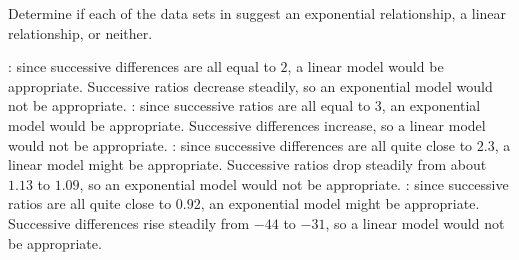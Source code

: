 \begin{doyouunderstand}
	\begin{problem}
	Determine if each of the data sets in  
	suggest an exponential relationship, a linear relationship, or neither. 
	\begin{shortsolution}
		: since successive differences are all equal to $2$, a linear model would be appropriate. 
		Successive ratios decrease steadily, so an exponential model would not be appropriate.
		: since successive ratios are all equal to $3$, an exponential model would be appropriate.  
		Successive differences increase, so a linear model would not be appropriate.
		: since successive differences are all quite close to $2.3$, a linear model might be appropriate.  
		Successive ratios drop steadily from about $1.13$ to $1.09$, so an exponential model would not be appropriate.
		: since successive ratios are all quite close to $0.92$, an exponential model might be appropriate.  
		Successive differences rise steadily from $-44$ to $-31$, so a linear model would not be appropriate.
	\end{shortsolution}
	\end{problem}
											

\end{doyouunderstand}
